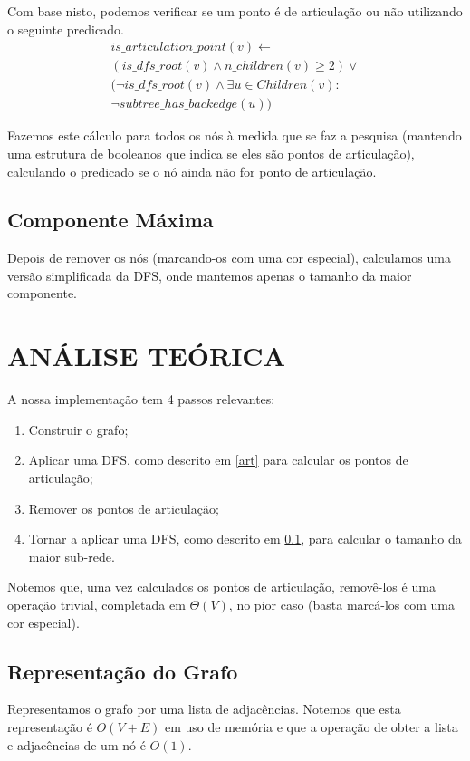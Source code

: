 \documentclass[a4paper, 12pt, conference]{ieeeconf}
\begin{document}
Com base nisto, podemos verificar se um ponto é de articulação ou não utilizando
o seguinte predicado.
\begin{align*}\label{predicate}
  is\_articulation\_point(v) \leftarrow \\ (is\_dfs\_root(v) \land n\_children(v) \geq
  2) \lor \\ (\lnot is\_dfs\_root(v) \land  \exists u \in Children(v) : \\ \lnot subtree\_has\_backedge(u))
\end{align*}

Fazemos este cálculo para todos os nós à medida que se faz a pesquisa (mantendo uma
estrutura de booleanos que indica se eles são pontos de articulação), calculando o
predicado se o nó ainda não for ponto de articulação.

\subsection{Componente Máxima}\label{dfs}
Depois de remover os nós (marcando-os com uma cor especial), calculamos uma
versão simplificada da DFS, onde mantemos apenas o tamanho da maior componente.

\section{ANÁLISE TEÓRICA}\label{theoric}

A nossa implementação tem 4 passos relevantes:
\begin{enumerate}
  \item
    Construir o grafo;
  \item
    Aplicar uma DFS, como descrito em \ref{art} para calcular os pontos de
    articulação;
  \item
    Remover os pontos de articulação;
  \item
    Tornar a aplicar uma DFS, como descrito em \ref{dfs}, para calcular o
    tamanho da maior sub-rede.
\end{enumerate}

Notemos que, uma vez calculados os pontos de articulação, removê-los é uma
operação trivial, completada em $\Theta(V)$, no pior caso (basta marcá-los com uma
cor especial).

\subsection{Representação do Grafo}
Representamos o grafo por uma lista de adjacências. Notemos que esta
representação é $O(V + E)$ \cite{cormen} em uso de memória e que a operação de obter a lista
e adjacências de um nó é $O(1)$.
\end{document}
